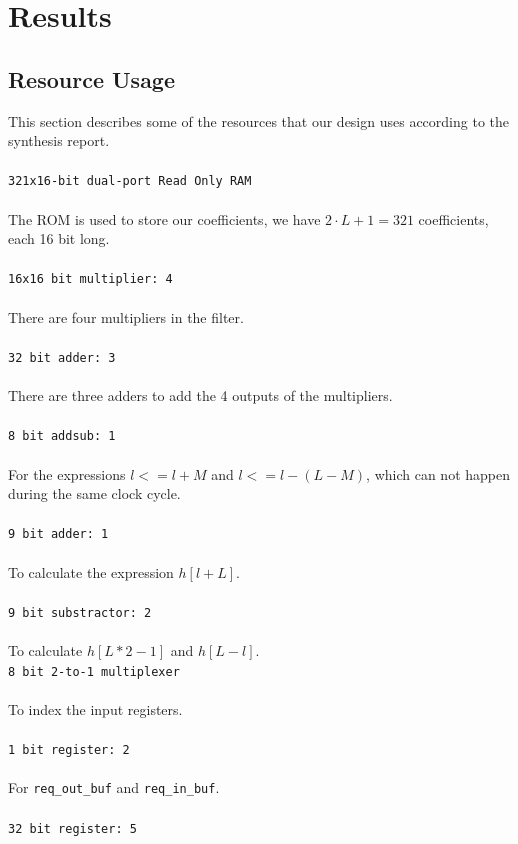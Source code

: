 \section{Results}
\subsection{Resource Usage}
This section describes some of the resources that our design uses according to the synthesis report.\\
\\
\texttt{321x16-bit dual-port Read Only RAM}\\
\\
The ROM is used to store our coefficients, we have $2\cdot L + 1 = 321$ coefficients, each 16 bit long.\\
\\
\texttt{16x16 bit multiplier: 4}\\
\\
There are four multipliers in the filter.\\
\\
\texttt{32 bit adder: 3}\\
\\
There are three adders to add the 4 outputs of the multipliers.\\
\\
\texttt{8 bit addsub: 1}\\
\\
For the expressions $l <= l + M$  and $l <= l - (L - M)$, which can not happen during the same clock cycle.\\
\\ 
\texttt{9 bit adder: 1}\\
\\
To calculate the expression $h[l + L]$.\\
\\
\texttt{9 bit substractor: 2}\\
\\
To calculate $h[L*2-1]$ and $h[L-l]$.
\\
\texttt{8 bit 2-to-1 multiplexer}\\
\\
To index the input registers.\\
\\
\texttt{1 bit register: 2}\\
\\
For \texttt{req\_out\_buf} and \texttt{req\_in\_buf}.\\
\\
\texttt{32 bit register: 5}\\

